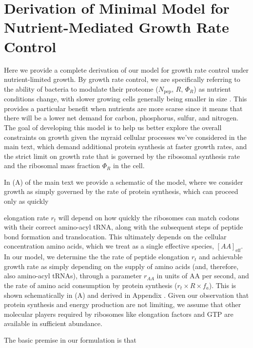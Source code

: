 
\section{Derivation of Minimal Model for Nutrient-Mediated Growth Rate Control}
\label{sec:SI_model}

Here we provide a complete derivation of our model for growth rate
control under nutrient-limited growth. By growth rate control, we are
specifically referring to the ability of bacteria to modulate their proteome
($N_\text{pep}$, $R$, $\Phi_R$) as nutrient conditions change, with slower
growing cells generally being smaller in size \citep{ojkic2019}. This provides a
particular benefit when nutrients are more scarse since it means that there will
be a lower net demand for carbon, phosphorus, sulfur, and nitrogen. The goal of
developing this model is to help us better explore the overall constraints on
growth given the myraid cellular processes we've considered in the main text,
which demand additional protein synthesis at faster growth rates, and the strict
limit on growth rate that is governed by the ribosomal synthesis rate and the
ribosomal mass fraction $\Phi_R$ in the cell.

In (A) of the main text we provide a schematic of the
model, where we consider growth as simply governed by the rate of protein synthesis,
which can proceed only as quickly  



elongation rate $r_t$ will depend on how quickly the ribosomes can
match codons with their correct amino-acyl tRNA, along with the subsequent steps
of peptide bond formation and translocation. This ultimately depends on the
cellular concentration amino acids, which we treat as a single effective
species, $[AA]_\text{eff}$. In our model, we determine the the rate of peptide
elongation $r_t$ and achievable growth rate as simply depending on the supply of
amino acids (and, therefore, also amino-acyl tRNAs), through a parameter
$r_{AA}$ in units of AA per second, and the rate of amino acid consumption by
protein synthesis ($r_t \times R \times f_a$). This is shown schematically in
(A) and derived in Appendix . Given our observation
that protein synthesis and energy production are not limiting, we
assume that other molecular players required by ribosomes like elongation
factors and GTP are available in sufficient abundance.

The basic premise in our formulation is that



